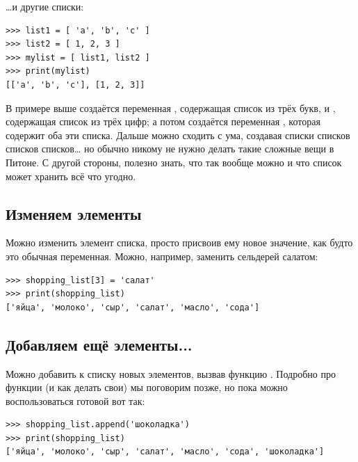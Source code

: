 …и другие списки:

\begin{listing}
\begin{verbatim}
>>> list1 = [ 'a', 'b', 'c' ]
>>> list2 = [ 1, 2, 3 ]
>>> mylist = [ list1, list2 ]
>>> print(mylist)
[['a', 'b', 'c'], [1, 2, 3]]
\end{verbatim}
\end{listing}

В примере выше создаётся переменная , содержащая список из трёх букв, и , содержащая список из трёх цифр; а потом создаётся переменная , которая содержит оба эти списка. Дальше можно сходить с ума, создавая списки списков списков списков… но обычно никому не нужно делать такие сложные вещи в Питоне. С другой стороны, полезно знать, что так вообще можно и что список может хранить всё что угодно.


\subsection*{\color{BrickRed}Изменяем элементы}

Можно изменить элемент списка, просто присвоив ему новое значение, как будто это обычная переменная. Можно, например, заменить сельдерей салатом:

\begin{listing}
\begin{verbatim}
>>> shopping_list[3] = 'салат'
>>> print(shopping_list)
['яйца', 'молоко', 'сыр', 'салат', 'масло', 'сода']
\end{verbatim}
\end{listing}

\subsection*{\color{BrickRed}Добавляем ещё элементы...}

Можно добавить к списку новых элементов, вызвав функцию . Подробно про функции (и как делать свои) мы поговорим позже, но пока можно воспользоваться готовой вот так:

\begin{listing}
\begin{verbatim}
>>> shopping_list.append('шоколадка')
>>> print(shopping_list)
['яйца', 'молоко', 'сыр', 'салат', 'масло', 'сода', 'шоколадка']
\end{verbatim}
\end{listing}

